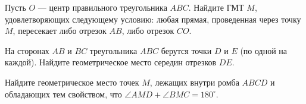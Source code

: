 \begin{problems}

\item   Пусть $O$ --- центр правильного треугольника $ABC$. Найдите ГМТ $M$, удовлетворяющих следующему условию: любая прямая, проведенная через точку $M$, пересекает либо отрезок $AB$, либо отрезок $CO$.


\item На сторонах $AB$ и $BC$ треугольника $ABC$ берутся точки $D$ и $E$ (по одной на каждой). Найдите геометрическое место середин отрезков $DE$.

\item Найдите геометрическое место точек $M$, лежащих внутри ромба $ABCD$ и обладающих тем свойством, что  $ \angle AMD +  \angle BMC = 180^\circ$.


\end{problems}
\renewcommand{\baselinestretch}{1}
\parskip
